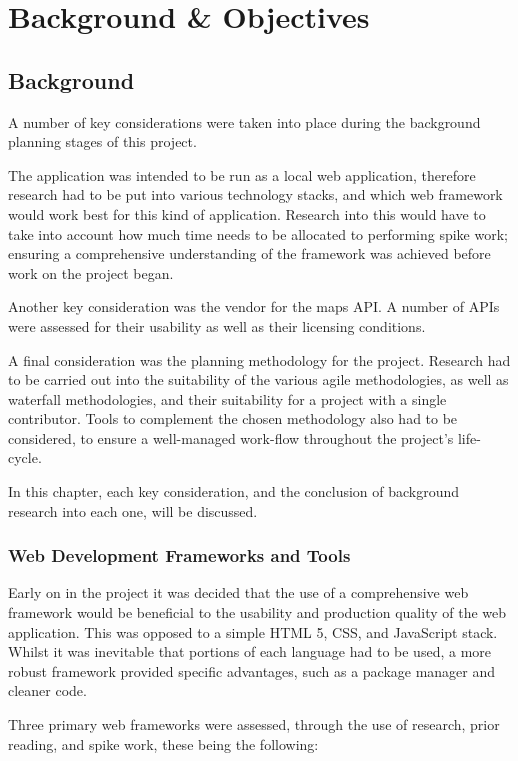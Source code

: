 \chapter{Background \& Objectives}

\section{Background}

A number of key considerations were taken into place during the background planning stages of this project.

The application was intended to be run as a local web application, therefore research had to be put into various technology stacks, and which web framework would work best for this kind of application. Research into this would have to take into account how much time needs to be allocated to performing spike work; ensuring a comprehensive understanding of the framework was achieved before work on the project began.

Another key consideration was the vendor for the maps API. A number of APIs were assessed for their usability as well as their licensing conditions.

A final consideration was the planning methodology for the project. Research had to be carried out into the suitability of the various agile methodologies, as well as waterfall methodologies, and their suitability for a project with a single contributor. Tools to complement the chosen methodology also had to be considered, to ensure a well-managed work-flow throughout the project's life-cycle.

In this chapter, each key consideration, and the conclusion of background research into each one, will be discussed.

\subsection{Web Development Frameworks and Tools}

Early on in the project it was decided that the use of a comprehensive web framework would be beneficial to the usability and production quality of the web application. This was opposed to a simple HTML 5, CSS, and JavaScript stack. Whilst it was inevitable that portions of each language had to be used, a more robust framework provided specific advantages, such as a package manager and cleaner code.

Three primary web frameworks were assessed, through the use of research, prior reading, and spike work, these being the following:

